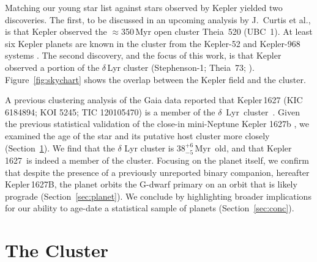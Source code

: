\documentclass[12pt,modern,twocolumn,tighten]{aastex63}
\newcommand{\cn}{$\delta$\ Lyr\ cluster} %
\newcommand{\sn}{Kepler\,1627} %
\newcommand{\clusterage}{$38^{+6}_{-5}$\,Myr} %
\begin{document}
Matching our young star list against stars observed by Kepler yielded
two discoveries.  The first, to be discussed in an upcoming analysis
by J.~Curtis et al{.}, is that Kepler observed the $\approx$350\,Myr
open cluster Theia~520 (UBC~1).  At least six Kepler planets are known
in the cluster from the Kepler-52 and Kepler-968 systems
\citep{rowe_validation_2014,jontof-hutter_following_2021}.  The second
discovery, and the focus of this work, is that Kepler observed a
portion of the $\delta$\,Lyr cluster (Stephenson-1; Theia~73;
\citealt{stephenson_possible_1959}).  Figure~\ref{fig:skychart} shows
the overlap between the Kepler field and the cluster.

A previous clustering analysis of the Gaia data reported that
Kepler\,1627 (KIC 6184894; KOI 5245; TIC 120105470) is a member of the
\cn\ \citep{kounkel_untangling_2019}.  Given the previous statistical
validation of the close-in mini-Neptune Kepler 1627b
\citep{2012ApJS..199...24T,morton_false_2016,thompson_planetary_2018},
we examined the age of the star and its putative host cluster more
closely (Section~\ref{sec:cluster}).  We find that the $\delta$ Lyr
cluster is \clusterage\ old, and that \sn\ is indeed a member of the
cluster.  Focusing on the planet itself, we confirm that despite the
presence of a previously unreported binary companion, hereafter
Kepler\,1627B, the planet orbits the G-dwarf primary on an orbit that
is likely prograde
(Section~\ref{sec:planet}).  We conclude by highlighting broader
implications for our ability to age-date a statistical sample of
planets (Section~\ref{sec:conc}).


\section{The Cluster}
\label{sec:cluster}
\end{document}
